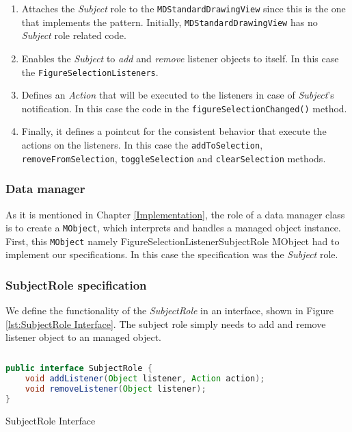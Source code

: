 \begin{enumerate}
	\item Attaches the \textit{Subject} role to the \texttt{MDStandardDrawingView} since this is the one that implements the pattern.
	Initially, \texttt{MDStandardDrawingView} has no \textit{Subject} role related code.

	\item Enables the \textit{Subject} to \textit{add} and \textit{remove} listener objects to itself. 
	\newline
	In this case the \texttt{FigureSelectionListeners}.

	\item Defines an \textit{Action} that will be executed to the listeners in case of \textit{Subject}'s notification.
	\newline
	In this case the code in the \texttt{figureSelectionChanged()} method.

	\item Finally, it defines a pointcut for the consistent behavior that execute the actions on the listeners. In this case the \texttt{addToSelection}, \texttt{removeFromSelection}, \texttt{toggleSelection} and \texttt{clearSelection} methods.
\end{enumerate}

\subsubsection{Data manager}
As it is mentioned in Chapter \ref{Implementation}, the role of a data manager class is to create a \texttt{MObject}, which interprets and handles a managed object instance.
First, this \texttt{MObject} namely FigureSelectionListenerSubjectRole MObject had to implement our specifications.
In this case the specification was the \textit{Subject} role.

\subsubsection{SubjectRole specification}
We define the functionality of the \textit{SubjectRole} in an interface, shown in Figure \ref{lst:SubjectRole Interface}.
The subject role simply needs to add and remove listener object to an managed object.

\begin{sourcecode} [H]
	\begin{lstlisting}[language=Java, escapechar=|]
public interface SubjectRole {
	void addListener(Object listener, Action action);
	void removeListener(Object listener);
}
	\end{lstlisting}
	\caption{SubjectRole Interface}
	\label{lst:SubjectRole Interface}
\end{sourcecode}

